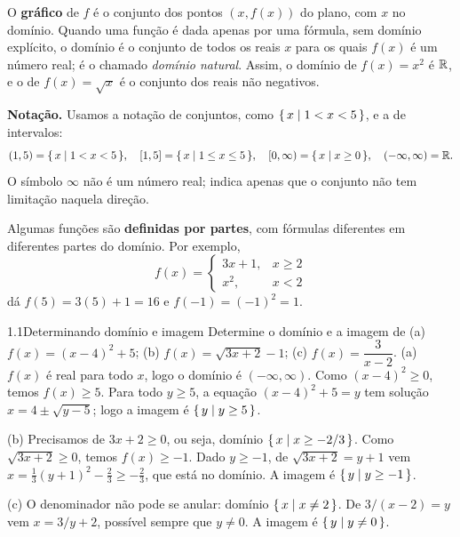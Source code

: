 
O \textbf{gráfico} de $f$ é o conjunto dos pontos $(x,f(x))$ do plano, com $x$ no domínio.
Quando uma função é dada apenas por uma fórmula, sem domínio explícito, o domínio é o
conjunto de todos os reais $x$ para os quais $f(x)$ é um número real; é o chamado
\emph{domínio natural}. Assim, o domínio de $f(x)=x^2$ é $\mathbb{R}$, e o de $f(x)=\sqrt{x}$ é o
conjunto dos reais não negativos.

\textbf{Notação.} Usamos a notação de conjuntos, como $\{\,x \mid 1<x<5\,\}$, e a de intervalos:
\[
(1,5)=\{\,x \mid 1<x<5\,\},\quad [1,5]=\{\,x \mid 1\le x\le 5\,\},\quad
[0,\infty)=\{\,x \mid x\ge 0\,\},\quad (-\infty,\infty)=\mathbb{R} .
\]
O símbolo $\infty$ não é um número real; indica apenas que o conjunto não tem limitação
naquela direção.

Algumas funções são \textbf{definidas por partes}, com fórmulas diferentes em diferentes
partes do domínio. Por exemplo,
\[
f(x)=\begin{cases}3x+1, & x\ge 2\\ x^2, & x<2\end{cases}
\]
dá $f(5)=3(5)+1=16$ e $f(-1)=(-1)^2=1$.

\begin{exemplo}{1.1}{Determinando domínio e imagem}
Determine o domínio e a imagem de (a) $f(x)=(x-4)^2+5$; (b) $f(x)=\sqrt{3x+2}-1$;
(c) $f(x)=\dfrac{3}{x-2}$.
\solucao
(a) $f(x)$ é real para todo $x$, logo o domínio é $(-\infty,\infty)$. Como $(x-4)^2\ge0$,
temos $f(x)\ge5$. Para todo $y\ge5$, a equação $(x-4)^2+5=y$ tem solução
$x=4\pm\sqrt{y-5}$; logo a imagem é $\{\,y \mid y\ge5\,\}$.

(b) Precisamos de $3x+2\ge0$, ou seja, domínio $\{\,x \mid x\ge -2/3\,\}$. Como
$\sqrt{3x+2}\ge0$, temos $f(x)\ge-1$. Dado $y\ge-1$, de $\sqrt{3x+2}=y+1$ vem
$x=\tfrac13(y+1)^2-\tfrac23\ge-\tfrac23$, que está no domínio. A imagem é $\{\,y \mid y\ge-1\,\}$.

(c) O denominador não pode se anular: domínio $\{\,x \mid x\neq2\,\}$. De $3/(x-2)=y$ vem
$x=3/y+2$, possível sempre que $y\neq0$. A imagem é $\{\,y \mid y\neq0\,\}$.
\end{exemplo}

